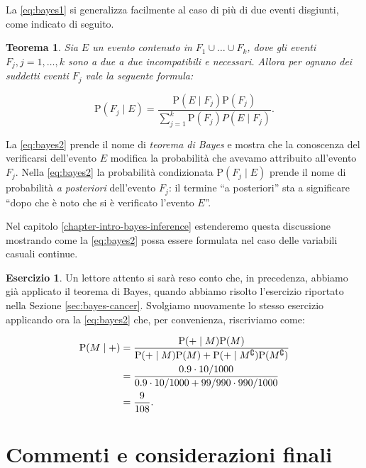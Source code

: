 \documentclass[
  11pt,
]{krantz}
\newtheorem{theorem}{Teorema}[chapter]
\theoremstyle{definition}
\theoremstyle{definition}
\theoremstyle{definition}
\newtheorem{exercise}{Esercizio}[chapter]
\theoremstyle{definition}
\theoremstyle{remark}
\begin{document}
\noindent La \eqref{eq:bayes1} si generalizza facilmente al caso di più di due eventi disgiunti, come indicato di seguito.

\begin{theorem}
Sia \(E\) un evento contenuto in \(F_1 \cup \dots \cup F_k\), dove gli eventi \(F_j, j=1, \dots, k\) sono a due a due incompatibili e necessari. Allora per ognuno dei suddetti eventi \(F_j\) vale la seguente formula:

\begin{equation}
{\mbox{P}}(F_j \mid E) = \frac{{\mbox{P}}(E \mid F_j){\mbox{P}}(F_j)}{\sum_{j=1}^{k}{\mbox{P}}(F_j)P(E \mid F_j)}.
\label{eq:bayes2}
\end{equation}
\end{theorem}

\noindent La \eqref{eq:bayes2} prende il nome di \emph{teorema di Bayes} e mostra che la conoscenza del verificarsi dell'evento \(E\) modifica la probabilità che avevamo attribuito all'evento \(F_j\). Nella \eqref{eq:bayes2} la probabilità condizionata \({\mbox{P}}(F_j \mid E)\) prende il nome di probabilità \emph{a posteriori} dell'evento \(F_j\): il termine ``a posteriori'' sta a significare ``dopo che è noto che si è verificato l'evento \(E\)''.

Nel capitolo \ref{chapter-intro-bayes-inference} estenderemo questa discussione mostrando come la \eqref{eq:bayes2} possa essere formulata nel caso delle variabili casuali continue.

\begin{exercise}
Un lettore attento si sarà reso conto che, in precedenza, abbiamo già applicato il teorema di Bayes, quando abbiamo risolto l'esercizio riportato nella Sezione \ref{sec:bayes-cancer}. Svolgiamo nuovamente lo stesso esercizio applicando ora la \eqref{eq:bayes2} che, per convenienza, riscriviamo come:

\begin{align}
{\mbox{P}}(M \mid +) &= \frac{{\mbox{P}}(+ \mid M) {\mbox{P}}(M)}{{\mbox{P}}(+ \mid M) {\mbox{P}}(M) + {\mbox{P}}(+ \mid M^\complement) {\mbox{P}}(M^\complement)}\notag\\ 
&= \frac{0.9 \cdot 10/1000}{0.9 \cdot 10/1000 + 99 / 990 \cdot 990 / 1000} \notag\\
&= \frac{9}{108}.\notag
\end{align}
\end{exercise}

\hypertarget{commenti-e-considerazioni-finali-2}{%
\section*{Commenti e considerazioni finali}\label{commenti-e-considerazioni-finali-2}}
\end{document}
